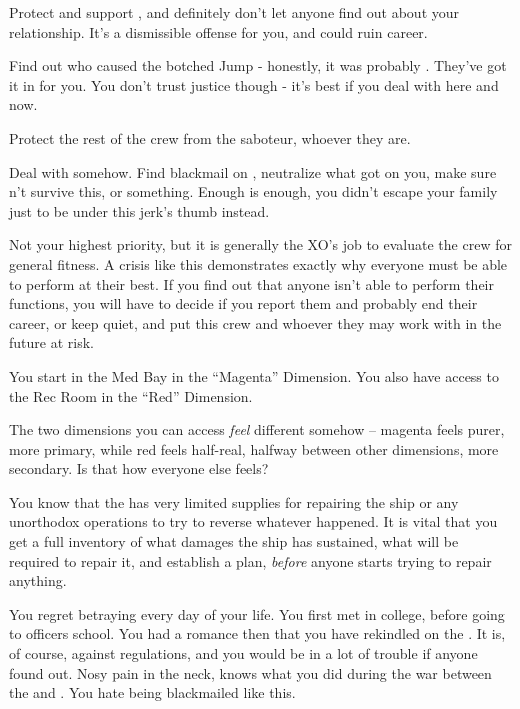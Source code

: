 \documentclass[char]{TMFHope}
\begin{document}
\begin{itemz}[Goals]
	\item Protect and support \cSci{}, and definitely don't let anyone find out about your relationship. It's a dismissible offense for you, and could ruin \cSci{\their} career.
	\item Find out who caused the botched Jump - honestly, it was probably \cDip{}. They've got it in for you. You don't trust \pPlan{} justice though - it's best if you deal with \cDip{\them} here and now.
	\item Protect the rest of the crew from the saboteur, whoever they are.
	\item Deal with \cDip{} somehow. Find blackmail on \cDip{\them}, neutralize what \cDip{\they} \cDip{\have} got on you, make sure \cDip{\they} \cDip{\does}n't survive this, or something. Enough is enough, you didn't escape your family just to be under this jerk's thumb instead.
	\item Not your highest priority, but it is generally the XO's job to evaluate the crew for general fitness. A crisis like this demonstrates exactly why everyone must be able to perform at their best. If you find out that anyone isn't able to perform their functions, you will have to decide if you report them and probably end their career, or keep quiet, and put this crew and whoever they may work with in the future at risk.
\end{itemz}

\begin{itemz}[Notes]
	\item You start in the Med Bay in the ``Magenta'' Dimension. You also have access to the Rec Room in the ``Red'' Dimension. 
	\item The two dimensions you can access {\em feel} different somehow -- magenta feels purer, more primary, while red feels half-real, halfway between other dimensions, more secondary.  Is that how everyone else feels?
	\item You know that the \pNew{} has very limited supplies for repairing the ship or any unorthodox operations to try to reverse whatever happened. It is vital that you get a full inventory of what damages the ship has sustained, what will be required to repair it, and establish a plan, \emph{before} anyone starts trying to repair anything.
\end{itemz}

\begin{contacts}
	\contact{\cCap{}} You regret betraying \cCap{} every day of your life.
	\contact{\cSci{}} You first met \cSci{} in college, before going to officers school. You had a romance then that you have rekindled on the \pNew{}. It is, of course, against regulations, and you would be in a lot of trouble if anyone found out.
	\contact{\cDip{}} Nosy pain in the neck, \cDip{} knows what you did during the war between the \pPlan{} and \pEdge{}. You hate being blackmailed like this.
\end{contacts}
\end{document}

